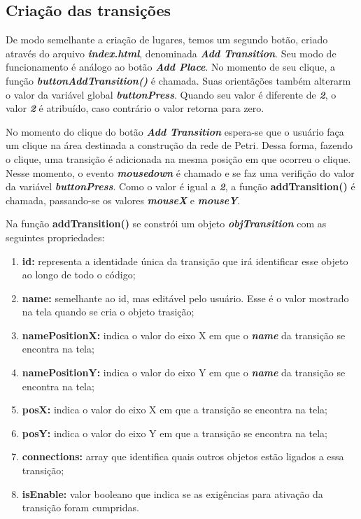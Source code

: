 \documentclass[
	12pt,				%
	openright,			%
	oneside,			%
	a4paper,			%
	english,			%
	brazil				%
	]{abntex2}
\begin{document}
\subsection*{Criação das transições}

De modo semelhante a criação de lugares, temos um segundo botão, criado através do arquivo \textbf{\textit{index.html}}, denominada \textbf{\textit{Add Transition}}. Seu modo de funcionamento é análogo ao botão \textbf{\textit{Add Place}}. No momento de seu clique, a função \textbf{\textit{buttonAddTransition()}} é chamada. Suas orientãções também alterarm o valor da variável global \textbf{\textit{buttonPress}}. Quando seu valor é diferente de \textbf{\textit{2}}, o valor \textbf{\textit{2}} é atribuído, caso contrário o valor retorna para zero. 



No momento do clique do botão \textbf{\textit{Add Transition}} espera-se que o usuário faça um clique na área destinada a construção da rede de Petri. Dessa forma, fazendo o clique, uma transição é adicionada na mesma posição em que ocorreu o clique. Nesse momento, o evento \textbf{\textit{mousedown}} é chamado e se faz uma verifição do valor da variável \textbf{\textit{buttonPress}}. Como o valor é igual a \textbf{\textit{2}}, a função \textbf{addTransition()} é chamada, passando-se os valores \textbf{\textit{mouseX}} e \textbf{\textit{mouseY}}.



Na função \textbf{addTransition()} se constrói um objeto \textbf{\textit{objTransition}} com as seguintes propriedades:

\begin{enumerate}
	\item \textbf{id:} representa a identidade única da transição que irá identificar esse objeto ao longo de todo o código;
	\item \textbf{name:} semelhante ao id, mas editável pelo usuário. Esse é o valor mostrado na tela quando se cria o objeto trasição;
	\item \textbf{namePositionX:} indica o valor do eixo X em que o \textbf{\textit{name}} da transição se encontra na tela;
	\item \textbf{namePositionY:} indica o valor do eixo Y em que o \textbf{\textit{name}} da transição se encontra na tela;
	\item \textbf{posX:} indica o valor do eixo X em que a transição se encontra na tela;
	\item \textbf{posY:} indica o valor do eixo Y em que a transição se encontra na tela;
	\item \textbf{connections:} array que identifica quais outros objetos estão ligados a essa transição;
	\item \textbf{isEnable:} valor booleano que indica se as exigências para ativação da transição foram cumpridas.
\end{enumerate}
\end{document}

